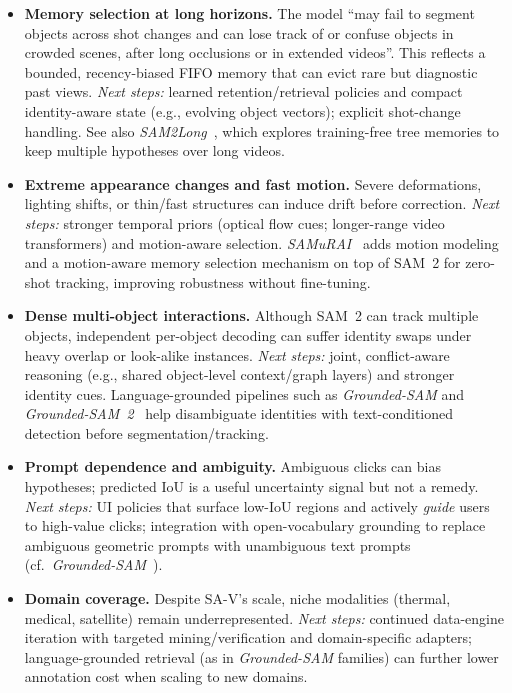 \begin{enrichment}
\begin{enrichment}
		\begin{itemize}
			\item \textbf{Memory selection at long horizons.} The model ``may fail to segment objects across shot changes and can lose track of or confuse objects in crowded scenes, after long occlusions or in extended videos''. This reflects a bounded, recency-biased FIFO memory that can evict rare but diagnostic past views. \emph{Next steps:} learned retention/retrieval policies and compact identity-aware state (e.g., evolving object vectors); explicit shot-change handling. See also \emph{SAM2Long}~\cite{ding2024_sam2long}, which explores training-free tree memories to keep multiple hypotheses over long videos.
			
			\item \textbf{Extreme appearance changes and fast motion.} Severe deformations, lighting shifts, or thin/fast structures can induce drift before correction. \emph{Next steps:} stronger temporal priors (optical flow cues; longer-range video transformers) and motion-aware selection. \emph{SAMuRAI}~\cite{yang2024_samurai} adds motion modeling and a motion-aware memory selection mechanism on top of SAM~2 for zero-shot tracking, improving robustness without fine-tuning.
			
			\item \textbf{Dense multi-object interactions.} Although SAM~2 can track multiple objects, independent per-object decoding can suffer identity swaps under heavy overlap or look-alike instances. \emph{Next steps:} joint, conflict-aware reasoning (e.g., shared object-level context/graph layers) and stronger identity cues. Language-grounded pipelines such as \emph{Grounded-SAM} and \emph{Grounded-SAM~2}~\cite{ren2024_groundedsam,groundedsam2_repo} help disambiguate identities with text-conditioned detection before segmentation/tracking.
			
			\item \textbf{Prompt dependence and ambiguity.} Ambiguous clicks can bias hypotheses; predicted IoU is a useful uncertainty signal but not a remedy. \emph{Next steps:} UI policies that surface low-IoU regions and actively \emph{guide} users to high-value clicks; integration with open-vocabulary grounding to replace ambiguous geometric prompts with unambiguous text prompts (cf.\ \emph{Grounded-SAM}~\cite{ren2024_groundedsam}).
			
			\item \textbf{Domain coverage.} Despite SA-V’s scale, niche modalities (thermal, medical, satellite) remain underrepresented. \emph{Next steps:} continued data-engine iteration with targeted mining/verification and domain-specific adapters; language-grounded retrieval (as in \emph{Grounded-SAM} families) can further lower annotation cost when scaling to new domains.
		\end{itemize}
		

\end{enrichment}
\end{enrichment}
